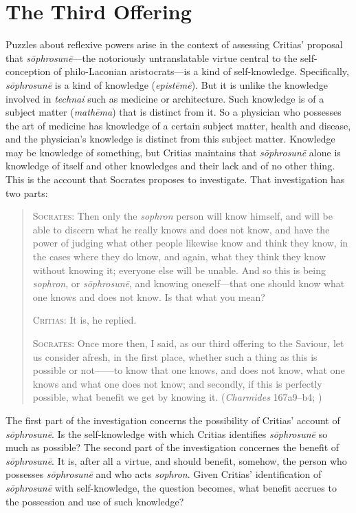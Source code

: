 
\section{The Third Offering} %
\label{sec:the_third_offering}

Puzzles about reflexive powers arise in the context of assessing Critias' proposal that \emph{sōphrosunē}—the notoriously untranslatable virtue central to the self-conception of philo-Laconian aristocrats—is a kind of self-knowledge. Specifically, \emph{sōphrosunē} is a kind of knowledge (\emph{epistēmē}). But it is unlike the knowledge involved in \emph{technai} such as medicine or architecture. Such knowledge is of a subject matter (\emph{mathēma}) that is distinct from it. So a physician who possesses the art of medicine has knowledge of a certain subject matter, health and disease, and the physician's knowledge is distinct from this subject matter. Knowledge may be knowledge of something, but Critias maintains that \emph{sōphrosunē} alone is knowledge of itself and other knowledges and their lack and of no other thing. This is the account that Socrates proposes to investigate. That investigation has two parts:
\begin{quotation}
	\textsc{Socrates}: Then only the \emph{sophron} person will know himself, and will be able to discern what he really knows and does not know, and have the power of judging what other people likewise know and think they know, in the cases where they do know, and again, what they think they know without knowing it; everyone else will be unable. And so this is being \emph{sophron}, or \emph{sōphrosunē}, and knowing oneself—that one should know what one knows and does not know. Is that what you mean?
	
	\textsc{Critias}: It is, he replied.
	
	\textsc{Socrates}: Once more then, I said, as our third offering to the Saviour, let us consider afresh, in the first place, whether such a thing as this is possible or not——to know that one knows, and does not know, what one knows and what one does not know; and secondly, if this is perfectly possible, what benefit we get by knowing it. (\emph{Charmides} 167a9–b4; \citealt[57]{Lamb:1927qw})
\end{quotation}
The first part of the investigation concerns the possibility of Critias' account of \emph{sōphrosunē}. Is the self-knowledge with which Critias identifies \emph{sōphrosunē} so much as possible? The second part of the investigation concernes the benefit of \emph{sōphrosunē}. It is, after all a virtue, and should benefit, somehow, the person who possesses \emph{sōphrosunē} and who acts \emph{sophron}. Given Critias' identification of \emph{sōphrosunē} with self-knowledge, the question becomes, what benefit accrues to the possession and use of such knowledge?
 
